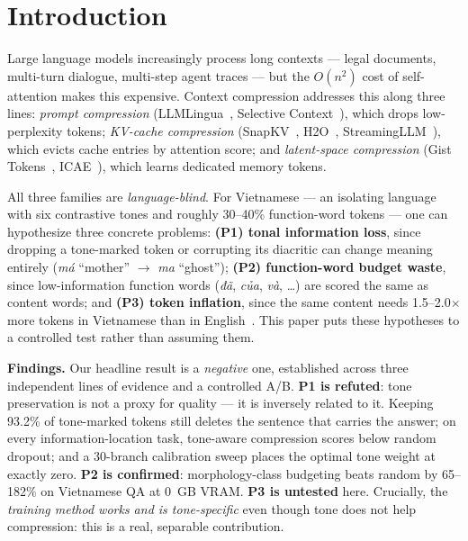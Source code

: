 \documentclass[runningheads]{llncs}
\newcommand{\viet}[1]{\textit{#1}}
\begin{document}
\begin{abstract}
\end{abstract}


\section{Introduction}

Large language models increasingly process long contexts --- legal documents, multi-turn dialogue, multi-step agent traces --- but the $O(n^2)$ cost of self-attention makes this expensive. Context compression addresses this along three lines: \emph{prompt compression} (LLMLingua~\cite{jiang2023llmlingua}, Selective Context~\cite{li2023selective}), which drops low-perplexity tokens; \emph{KV-cache compression} (SnapKV~\cite{li2024snapkv}, H2O~\cite{zhang2023h2o}, StreamingLLM~\cite{xiao2024streamingllm}), which evicts cache entries by attention score; and \emph{latent-space compression} (Gist Tokens~\cite{mu2023gist}, ICAE~\cite{ge2024icae}), which learns dedicated memory tokens.

All three families are \emph{language-blind}. For Vietnamese --- an isolating language with six contrastive tones and roughly 30--40\% function-word tokens --- one can hypothesize three concrete problems: \textbf{(P1) tonal information loss}, since dropping a tone-marked token or corrupting its diacritic can change meaning entirely (\viet{má} ``mother'' $\to$ \viet{ma} ``ghost''); \textbf{(P2) function-word budget waste}, since low-information function words (\viet{đã}, \viet{của}, \viet{và}, \ldots) are scored the same as content words; and \textbf{(P3) token inflation}, since the same content needs 1.5--2.0$\times$ more tokens in Vietnamese than in English~\cite{lee2026equity,deng2026language}. This paper puts these hypotheses to a controlled test rather than assuming them.

\textbf{Findings.} Our headline result is a \emph{negative} one, established across three independent lines of evidence and a controlled A/B. \textbf{P1 is refuted}: tone preservation is not a proxy for quality --- it is inversely related to it. Keeping 93.2\% of tone-marked tokens still deletes the sentence that carries the answer; on every information-location task, tone-aware compression scores below random dropout; and a 30-branch calibration sweep places the optimal tone weight at exactly zero. \textbf{P2 is confirmed}: morphology-class budgeting beats random by 65--182\% on Vietnamese QA at 0~GB VRAM. \textbf{P3 is untested} here. Crucially, the \emph{training method works and is tone-specific} even though tone does not help compression: this is a real, separable contribution.
\end{document}
